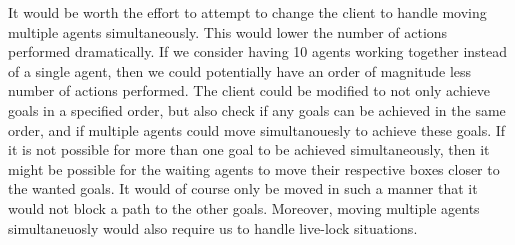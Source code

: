 It would be worth the effort to attempt to change the client to handle moving multiple agents simultaneously.
This would lower the number of actions performed dramatically.
If we consider having 10 agents working together instead of a single agent, then we could potentially have an order of magnitude less number of actions performed.
The client could be modified to not only achieve goals in a specified order, but also check if any goals can be achieved in the same order, and if multiple agents could move simultanouesly to achieve these goals.
If it is not possible for more than one goal to be achieved simultaneously, then it might be possible for the waiting agents to move their respective boxes closer to the wanted goals.
It would of course only be moved in such a manner that it would not block a path to the other goals.
Moreover, moving multiple agents simultaneuosly would also require us to handle live-lock situations.
